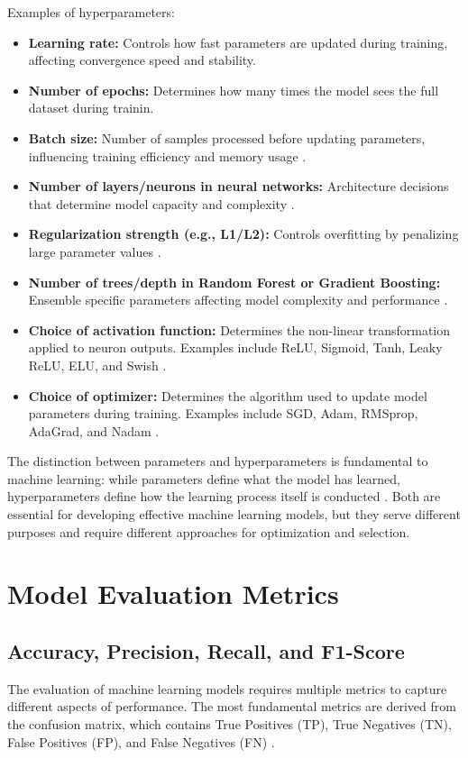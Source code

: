\documentclass[12pt, a4paper]{report}
\begin{document}
Examples of hyperparameters:
\begin{itemize}
    \item \textbf{Learning rate:} Controls how fast parameters are updated during training, affecting convergence speed and stability.
    \item \textbf{Number of epochs:} Determines how many times the model sees the full dataset during trainin.
    \item \textbf{Batch size:} Number of samples processed before updating parameters, influencing training efficiency and memory usage .
    \item \textbf{Number of layers/neurons in neural networks:} Architecture decisions that determine model capacity and complexity .
    \item \textbf{Regularization strength (e.g., L1/L2):} Controls overfitting by penalizing large parameter values .
    \item \textbf{Number of trees/depth in Random Forest or Gradient Boosting:} Ensemble specific parameters affecting model complexity and performance .
    \item \textbf{Choice of activation function:} Determines the non-linear transformation applied to neuron outputs. Examples include ReLU, Sigmoid, Tanh, Leaky ReLU, ELU, and Swish .
    \item \textbf{Choice of optimizer:} Determines the algorithm used to update model parameters during training. Examples include SGD, Adam, RMSprop, AdaGrad, and Nadam .
\end{itemize}

The distinction between parameters and hyperparameters is fundamental to machine learning: while parameters define what the model has learned, hyperparameters define how the learning process itself is conducted . Both are essential for developing effective machine learning models, but they serve different purposes and require different approaches for optimization and selection.

\section{Model Evaluation Metrics}

\subsection{Accuracy, Precision, Recall, and F1-Score}
The evaluation of machine learning models requires multiple metrics to capture different aspects of performance. The most fundamental metrics are derived from the confusion matrix, which contains True Positives (TP), True Negatives (TN), False Positives (FP), and False Negatives (FN) .
\end{document}
